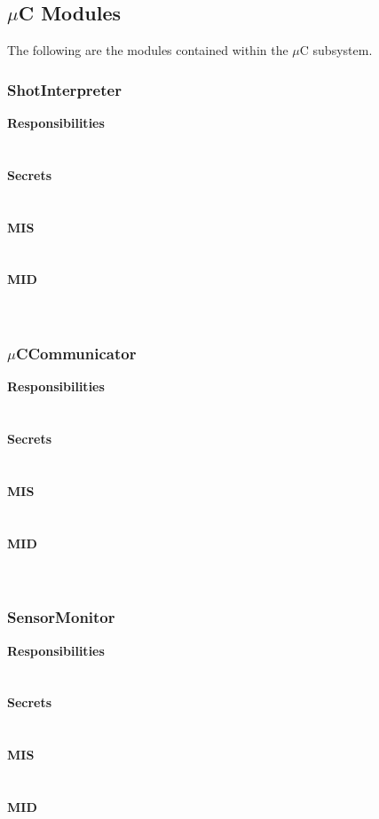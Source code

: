 \documentclass[titlepage]{article}
\begin{document}
\subsection{$\mu$C Modules}
The following are the modules contained within the $\mu$C subsystem.
\subsubsection{ShotInterpreter}
\textbf{Responsibilities}\\
\\\\%
\textbf{Secrets}\\
\\\\%
\textbf{MIS}\\
\\\\%
\textbf{MID}\\
\\\\%
\subsubsection{$\mu$CCommunicator}
\textbf{Responsibilities}\\
\\\\%
\textbf{Secrets}\\
\\\\%
\textbf{MIS}\\
\\\\%
\textbf{MID}\\
\\\\%
\subsubsection{SensorMonitor}
\textbf{Responsibilities}\\
\\\\%
\textbf{Secrets}\\
\\\\%
\textbf{MIS}\\
\\\\%
\textbf{MID}\\
\\\\%
\end{document}
